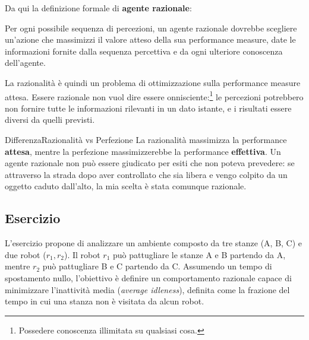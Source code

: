 \documentclass[a4paper, 11pt, oneside]{book}
\theoremstyle{definition}
\begin{document}
	Da qui la definizione formale di \textbf{agente razionale}:
	\begin{definizione}
		Per ogni possibile sequenza di percezioni, un agente razionale dovrebbe
		scegliere un'azione che massimizzi il valore atteso della sua performance
		measure, date le informazioni fornite dalla sequenza percettiva e da ogni
		ulteriore conoscenza dell'agente.
	\end{definizione}

	La razionalit\`a \`e quindi un problema di ottimizzazione sulla performance measure
	attesa. Essere razionale non vuol dire essere onnisciente:\footnote{Possedere
	conoscenza illimitata su qualsiasi cosa.} le percezioni potrebbero non fornire tutte
	le informazioni rilevanti in un dato istante, e i risultati essere diversi da quelli
	previsti.

	\begin{nota}
		{Differenza}{Razionalit\`a vs Perfezione} La razionalit\`a massimizza la
		performance \textbf{attesa}, mentre la perfezione massimizzerebbe la
		performance \textbf{effettiva}. Un agente razionale non pu\`o essere
		giudicato per esiti che non poteva prevedere: se attraverso la strada dopo aver
		controllato che sia libera e vengo colpito da un oggetto caduto dall'alto,
		la mia scelta \`e stata comunque razionale.
	\end{nota}

	\subsection{Esercizio}
	L'esercizio propone di analizzare un ambiente composto da tre stanze (A, B, C)
	e due robot ($r_{1}, r_{2}$). Il robot $r_{1}$ pu\`o pattugliare le stanze A e
	B partendo da A, mentre $r_{2}$ pu\`o pattugliare B e C partendo da C.
	Assumendo un tempo di spostamento nullo, l'obiettivo \`e definire un
	comportamento razionale capace di minimizzare l'inattivit\`a media (\emph{average
	idleness}), definita come la frazione del tempo in cui una stanza non \`e visitata
	da alcun robot.
\end{document}
